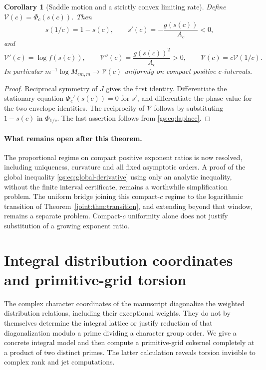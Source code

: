 \documentclass[11pt,a4paper]{article}
\numberwithin{equation}{section}
\theoremstyle{plain}
\newtheorem{corollary}[theorem]{Corollary}
\theoremstyle{definition}
\theoremstyle{remark}
\begin{document}
\begin{corollary}[Saddle motion and a strictly convex limiting rate]
\label{gs:cor:envelope}
Define $\mathcal V(c)=\Phi_c(s(c))$. Then
\[
 s(1/c)=1-s(c),\qquad
 s'(c)=-\frac{g(s(c))}{A_c}<0,
\]
and
\[
 \mathcal V'(c)=\log f(s(c)),\qquad
 \mathcal V''(c)=\frac{g(s(c))^2}{A_c}>0,
 \qquad \mathcal V(c)=c\mathcal V(1/c).
\]
In particular $m^{-1}\log M_{cm,m}\to\mathcal V(c)$ uniformly on
compact positive $c$-intervals.
\end{corollary}
\begin{proof}
Reciprocal symmetry of $J$ gives the first identity. Differentiate
the stationary equation $\Phi_c'(s(c))=0$ for $s'$, and differentiate
the phase value for the two envelope identities. The reciprocity of
$\mathcal V$ follows by substituting $1-s(c)$ in $\Phi_{1/c}$.
The last assertion follows from \eqref{gs:eq:laplace}.
\end{proof}

\paragraph{What remains open after this theorem.}
The proportional regime on compact positive exponent ratios is now
resolved, including uniqueness, curvature and all fixed asymptotic
orders. A proof of the global inequality \eqref{gs:eq:global-derivative}
using only an analytic inequality, without the finite interval
certificate, remains a worthwhile simplification problem. The uniform
bridge joining this compact-$c$ regime to the logarithmic transition
of Theorem~\ref{joint:thm:transition}, and extending beyond that
window, remains a separate problem. Compact-$c$ uniformity alone
does not justify substitution of a growing exponent ratio.


\section{Integral distribution coordinates and primitive-grid torsion}
\label{intdist:sec:main}

The complex character coordinates of the manuscript diagonalize the
weighted distribution relations, including their exceptional weights.
They do not by themselves determine the integral lattice or justify
reduction of that diagonalization modulo a prime dividing a character
group order. We give a concrete integral model and then compute a
primitive-grid cokernel completely at a product of two distinct primes.
The latter calculation reveals torsion invisible to complex rank and
jet computations.
\end{document}
